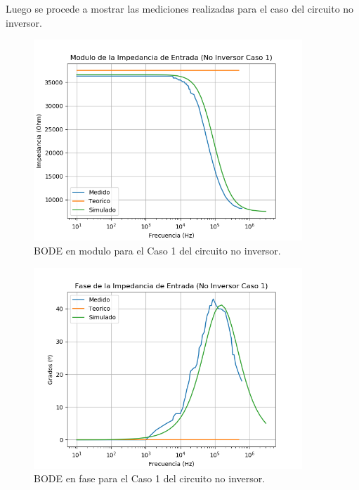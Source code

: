 Luego se procede a mostrar las mediciones realizadas para el caso del circuito no inversor.

\begin{figure}[H]	
	\centering
	\includegraphics[width=0.9\textwidth]{Ejercicio1/Imagenes/ZinC1_Noinv.png}
	\caption{BODE en modulo para el Caso 1 del circuito no inversor.}
	\label{fig:NoInvCompZinC1}
\end{figure} 

\begin{figure}[H]	
	\centering
	\includegraphics[width=0.9\textwidth]{Ejercicio1/Imagenes/ZinphC1_Noinv.png}
	\caption{BODE en fase para el Caso 1 del circuito no inversor.}
	\label{fig:NoInvCompZinphC1}
\end{figure} 

